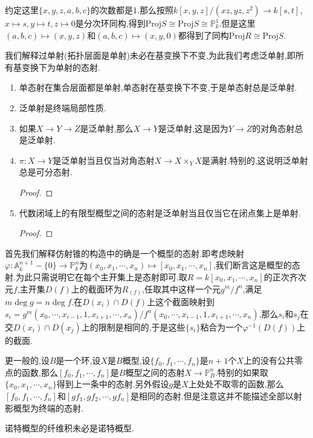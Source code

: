 约定这里$\{x,y,z,a,b,c\}$的次数都是1.那么按照$k[x,y,z]/(xz,yz,z^2)\to k[s,t]$,$x\mapsto s,y\mapsto t,z\mapsto0$是分次环同构,得到$\mathrm{Proj}S\cong\mathrm{Proj}S\cong\mathbb{P}_k^1$.但是这里$(a,b,c)\mapsto(x,y,z)$和$(a,b,c)\mapsto(x,y,0)$都得到了同构$\mathrm{Proj}R\cong\mathrm{Proj}S$.


我们解释过单射(拓扑层面是单射)未必在基变换下不变,为此我们考虑泛单射,即所有基变换下为单射的态射.
\begin{enumerate}
	\item 单态射在集合层面都是单射,单态射在基变换下不变,于是单态射总是泛单射.
	\item 泛单射是终端局部性质.
	\item 如果$X\to Y\to Z$是泛单射,那么$X\to Y$是泛单射,这是因为$Y\to Z$的对角态射总是泛单射.
	\item $\pi:X\to Y$是泛单射当且仅当对角态射$X\to X\times_YX$是满射.特别的,这说明泛单射总是可分态射.
	\begin{proof}
		
		
	\end{proof}
	\item 代数闭域上的有限型概型之间的态射是泛单射当且仅当它在闭点集上是单射.
	\begin{proof}
		
		
	\end{proof}
\end{enumerate}

\item 首先我们解释仿射锥的构造中的确是一个概型的态射.即考虑映射$\varphi:\mathbb{A}_k^{n+1}-\{0\}\to\mathbb{P}_k^n$为$(x_0,x_1,\cdots,x_n)\mapsto[x_0,x_1,\cdots,x_n]$,我们断言这是概型的态射.为此只需说明它在每个主开集上是态射即可.取$R=k[x_0,x_1,\cdots,x_n]$的正次齐次元$f$,主开集$D(f)$上的截面环为$R_{(f)}$,任取其中这样一个元$g^m/f^n$,满足$m\deg g=n\deg f$.在$D(x_i)\cap D(f)$上这个截面映射到$s_i=g^m(x_0,\cdots,x_{i-1},1,x_{i+1},\cdots,x_n)/f^n(x_0,\cdots,x_{i-1},1,x_{i+1},\cdots,x_n)$,那么$s_i$和$s_j$在交$D(x_i)\cap D(x_j)$上的限制是相同的,于是这些$\{s_i\}$粘合为一个$\varphi^{-1}(D(f))$上的截面.
\item 更一般的,设$B$是一个环,设$X$是$B$概型,设$\{f_0,f_1,\cdots,f_n\}$是$n+1$个$X$上的没有公共零点的函数,那么$[f_0,f_1,\cdots,f_n]$是$B$概型之间的态射$X\to\mathbb{P}_B^n$.特别的如果取$\{x_0,x_1,\cdots,x_n\}$得到上一条中的态射.另外假设$g$是$X$上处处不取零的函数,那么$[f_0,f_1,\cdots,f_n]$和$[gf_1,gf_2,\cdots,gf_n]$是相同的态射.但是注意这并不能描述全部以射影概型为终端的态射.

诺特概型的纤维积未必是诺特概型.

